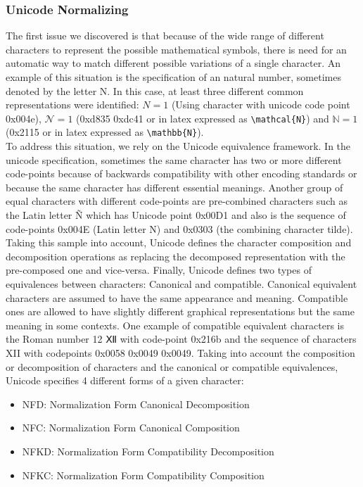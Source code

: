 \subsubsection{Unicode Normalizing} 
The first issue we discovered is that because of the wide range of different characters to represent the possible mathematical symbols, there is need for an automatic way to match different possible variations of a single character. An example of this situation is the specification of an natural number, sometimes denoted by the letter N. In this case, at least three different common representations were identified: $ N = 1 $ (Using character with unicode code point 0x004e), $\mathcal{N} = 1$ (0xd835 0xdc41 or in latex expressed as \lstinline|\mathcal{N}|) and $\mathbb{N} = 1$ (0x2115 or in latex expressed as \lstinline|\mathbb{N}|). \\
  To address this situation, we rely on the Unicode equivalence framework. In the unicode specification, sometimes the same character has two or more different code-points because of backwards compatibility with other encoding standards or because the same character has different essential meanings. Another group of equal characters with different code-points are pre-combined characters such as the Latin letter \~{N} which has Unicode point 0x00D1 and also is the sequence of code-points 0x004E (Latin letter N) and 0x0303 (the combining character tilde). Taking this sample into account, Unicode defines the character composition and decomposition operations as replacing the decomposed representation with the pre-composed one and vice-versa. Finally, Unicode defines two types of equivalences between characters: Canonical and compatible. Canonical equivalent characters are assumed to have the same appearance and meaning. Compatible ones are allowed to have slightly different graphical representations but the same meaning in some contexts. One example of compatible equivalent characters is the Roman number 12 {\unicodefontⅫ} with code-point 0x216b and the sequence of characters XII with codepoints 0x0058 0x0049 0x0049. Taking into account the composition or decomposition of characters and the canonical or compatible equivalences, Unicode specifies 4 different forms of a given character:
  \begin{itemize}
  \itemsep0em
  \item NFD: Normalization Form Canonical Decomposition
  \item NFC: Normalization Form Canonical Composition
  \item NFKD: Normalization Form Compatibility Decomposition
  \item NFKC: Normalization Form Compatibility Composition
  \end{itemize}
  
